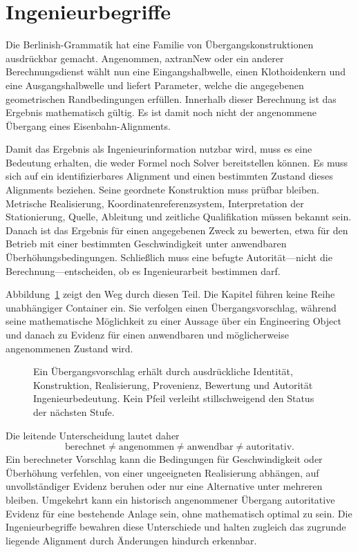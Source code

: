 
\chapter*{Ingenieurbegriffe}
{}

Die Berlinish-Grammatik hat eine Familie von Übergangskonstruktionen ausdrückbar
gemacht. Angenommen, axtranNew oder ein anderer Berechnungsdienst wählt nun eine
Eingangshalbwelle, einen Klothoidenkern und eine Ausgangshalbwelle und liefert
Parameter, welche die angegebenen geometrischen Randbedingungen erfüllen.
Innerhalb dieser Berechnung ist das Ergebnis mathematisch gültig. Es ist damit
noch nicht der angenommene Übergang eines Eisenbahn-Alignments.

Damit das Ergebnis als Ingenieurinformation nutzbar wird, muss es eine Bedeutung
erhalten, die weder Formel noch Solver bereitstellen können. Es muss sich auf ein
identifizierbares Alignment und einen bestimmten Zustand dieses Alignments
beziehen. Seine geordnete Konstruktion muss prüfbar bleiben. Metrische
Realisierung, Koordinatenreferenzsystem, Interpretation der Stationierung,
Quelle, Ableitung und zeitliche Qualifikation müssen bekannt sein. Danach ist
das Ergebnis für einen angegebenen Zweck zu bewerten, etwa für den Betrieb mit
einer bestimmten Geschwindigkeit unter anwendbaren Überhöhungsbedingungen.
Schließlich muss eine befugte Autorität---nicht die Berechnung---entscheiden, ob
es Ingenieurarbeit bestimmen darf.

Abbildung~\ref{fig:transition-meaning-chain} zeigt den Weg durch diesen Teil. Die
Kapitel führen keine Reihe unabhängiger Container ein. Sie verfolgen einen
Übergangsvorschlag, während seine mathematische Möglichkeit zu einer Aussage
über ein Engineering Object und danach zu Evidenz für einen anwendbaren und
möglicherweise angenommenen Zustand wird.

\begin{figure}[htbp]
  \centering
  \resizebox{\textwidth}{!}{}
  \caption{Ein Übergangsvorschlag erhält durch ausdrückliche Identität,
  Konstruktion, Realisierung, Provenienz, Bewertung und Autorität
  Ingenieurbedeutung. Kein Pfeil verleiht stillschweigend den Status der
  nächsten Stufe.}
  \label{fig:transition-meaning-chain}
\end{figure}

Die leitende Unterscheidung lautet daher
\begin{equation}
\text{berechnet}\neq\text{angenommen}\neq\text{anwendbar}
\neq\text{autoritativ}.
\label{eq:calculation-status-chain}
\end{equation}
Ein berechneter Vorschlag kann die Bedingungen für Geschwindigkeit oder
Überhöhung verfehlen, von einer ungeeigneten Realisierung abhängen, auf
unvollständiger Evidenz beruhen oder nur eine Alternative unter mehreren
bleiben. Umgekehrt kann ein historisch angenommener Übergang autoritative
Evidenz für eine bestehende Anlage sein, ohne mathematisch optimal zu sein. Die
Ingenieurbegriffe bewahren diese Unterschiede und halten zugleich das
zugrunde liegende Alignment durch Änderungen hindurch erkennbar.
